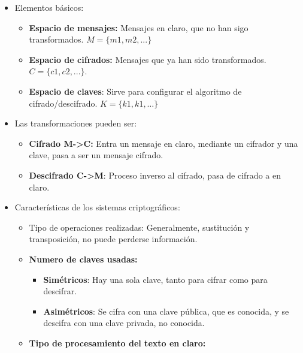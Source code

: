 \documentclass[12pt, twoside, openright]{report} %
\begin{document}
  \begin{itemize}
  \item Elementos básicos:
    
    \begin{itemize}
    \item \textbf{Espacio de mensajes:} Mensajes en claro, que no han sigo
      transformados. $M=\{m1,m2,...\}$
      
    \item \textbf{Espacio de cifrados:} Mensajes que ya han sido
      transformados. $C=\{c1,c2,...\}$.
      
    \item \textbf{Espacio de claves}: Sirve para configurar el algoritmo de
      cifrado/descifrado. $K=\{k1,k1,\ldots\}$
      
    \end{itemize}
  \item Las transformaciones pueden ser:
        \begin{itemize}
    \item \textbf{Cifrado M-\textgreater C:} Entra un mensaje en claro,
      mediante un cifrador y una clave, pasa a ser un mensaje cifrado.
      
    \item \textbf{Descifrado C-\textgreater M}: Proceso inverso al cifrado,
      pasa de cifrado a en claro.
      
    \end{itemize}
  \item Características de los sistemas criptográficos:
        \begin{itemize}
    \item Tipo de operaciones realizadas: Generalmente, sustitución y
      transposición, no puede perderse información.
      
    \item \textbf{Numero de claves usadas:}
      
      \begin{itemize}
      \item \textbf{Simétricos}: Hay una sola clave, tanto para cifrar como
        para descifrar.
        
      \item \textbf{Asimétricos}: Se cifra con una clave pública, que es
        conocida, y se descifra con una clave privada, no conocida.
        
      \end{itemize}
    \item \textbf{Tipo de procesamiento del texto en claro:}
      

\end{itemize}
\end{itemize}
\end{document}
